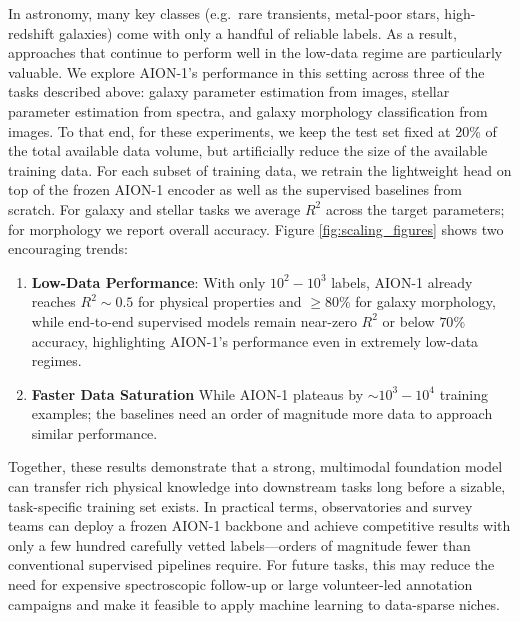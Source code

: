 \documentclass[]{polymathic}
\begin{document}
In astronomy, many key classes (e.g.\ rare transients, metal-poor stars, high-redshift galaxies) come with only a handful of reliable labels. As a result, approaches that continue to perform well in the low-data regime are particularly valuable. We explore AION-1's performance in this setting across three of the tasks described above: galaxy parameter estimation from images, stellar parameter estimation from spectra, and galaxy morphology classification from images. To that end, for these experiments, we keep the test set fixed at 20\% of the total available data volume, but artificially reduce the size of the available training data. For each subset of training data, we retrain the lightweight head on top of the frozen AION-1 encoder as well as the supervised baselines from scratch. For galaxy and stellar tasks we average $R^{2}$ across the target parameters; for morphology we report overall accuracy. Figure \autoref{fig:scaling_figures} shows two encouraging trends:
\begin{enumerate}
    \item \textbf{Low-Data Performance}: With only $10^{2}\!-\!10^{3}$ labels, AION-1 already reaches $R^{2}\!\sim\!0.5$ for physical properties and $\geq 80\%$ for galaxy morphology, while end-to-end supervised models remain near-zero $R^{2}$ or below $70\%$ accuracy, highlighting AION-1's performance even in extremely low-data regimes.
    \item \textbf{Faster Data Saturation} While AION-1 plateaus by $\sim 10^{3}\!-\!10^{4}$ training examples; the baselines need an order of magnitude more data to approach similar performance.
\end{enumerate}
Together, these results demonstrate that a strong, multimodal foundation model can transfer rich physical knowledge into downstream tasks long before a sizable, task-specific training set exists. In practical terms, observatories and survey teams can deploy a frozen AION-1 backbone and achieve competitive results with only a few hundred carefully vetted labels—orders of magnitude fewer than conventional supervised pipelines require. For future tasks, this may reduce the need for expensive spectroscopic follow-up or large volunteer-led annotation campaigns and make it feasible to apply machine learning to data-sparse niches. 
\end{document}
